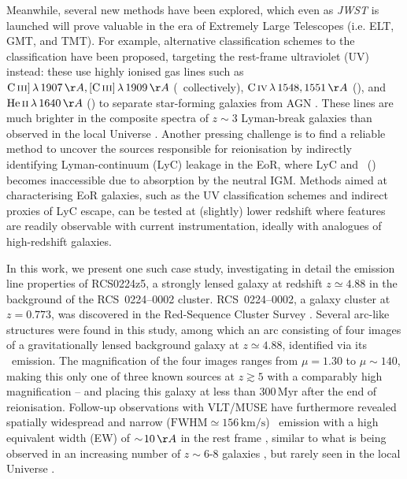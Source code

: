 Meanwhile, several new methods have been explored, which even as \textit{JWST} is launched will prove valuable in the era of Extremely Large Telescopes (i.e. ELT, GMT, and TMT). For example, alternative classification schemes to the  classification have been proposed, targeting the rest-frame ultraviolet (UV) instead: these use highly ionised gas lines such as $\CIIIs \, \lambda \, 1907 \, \Angstrom, \CIIIf \, \lambda \, 1909 \, \Angstrom$ (\CIII\ collectively), $\CIV \, \lambda \, 1548, 1551 \, \Angstrom$ (\CIV), and $\HeII \, \lambda \, 1640 \, \Angstrom$ (\HeII) to separate star-forming galaxies from AGN \citep[e.g.][]{2016MNRAS.456.3354F}. These lines are much brighter in the composite spectra of $z \sim 3$ Lyman-break galaxies than observed in the local Universe \citep[e.g.][]{2003ApJ...588...65S}. Another pressing challenge is to find a reliable method to uncover the sources responsible for reionisation by indirectly identifying Lyman-continuum (LyC) leakage in the EoR, where LyC and  \lymana\ (\lya) becomes inaccessible due to absorption by the neutral IGM. Methods aimed at characterising EoR galaxies, such as the UV classification schemes and indirect proxies of LyC escape, can be tested at (slightly) lower redshift where features are readily observable with current instrumentation, ideally with analogues of high-redshift galaxies.

In this work, we present one such case study, investigating in detail the emission line properties of RCS0224z5, a strongly lensed galaxy at redshift $z \simeq 4.88$ in the background of the RCS~0224--0002 cluster. RCS~0224--0002, a galaxy cluster at $z=0.773$, was discovered in the Red-Sequence Cluster Survey \citep[RCS;][]{2002AJ....123....1G}. Several arc-like structures were found in this study, among which an arc consisting of four images of a gravitationally lensed background galaxy at $z \simeq 4.88$, identified via its \lya\ emission. The magnification of the four images ranges from $\mu = 1.30$ to $\mu \sim 140$, making this only one of three known sources at $z \gtrsim 5$ with a comparably high magnification \citep{1997ApJ...486L..75F, 2009MNRAS.400.1121S, 2021ApJ...906..107K} -- and placing this galaxy at less than $300 \, \mathrm{Myr}$ after the end of reionisation. Follow-up observations with VLT/MUSE have furthermore revealed spatially widespread and narrow ($\text{FWHM} \simeq 156 \, \mathrm{km/s}$) \CIV\ emission with a high equivalent width (EW) of $\ssim 10 \, \Angstrom$ in the rest frame \citep{2017MNRAS.467.3306S}, similar to what is being observed in an increasing number of $z \sim 6$-$8$ galaxies \citep{2015MNRAS.454.1393S, 2017ApJ...836L..14M, 2017ApJ...851...40L}, but rarely seen in the local Universe \citep{2019ApJ...874...93B, 2019MNRAS.488.3492S}.

